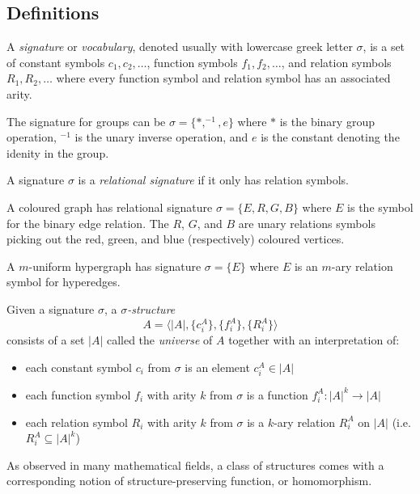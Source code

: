 \subsection{Definitions}
\begin{defn}
A \textit{signature} or \textit{vocabulary}, denoted usually with lowercase greek letter $\sigma$, is a set of constant symbols $c_{1},c_{2},\dots$, function symbols $f_{1},f_{2},\dots$, and relation symbols $R_{1},R_{2},\dots$ where every function symbol and relation symbol has an associated arity. 
\end{defn}
\begin{exmpl}
The signature for groups can be $\sigma = \{*,^{-1},e\}$ where $*$ is the binary group operation, $^{-1}$ is the unary inverse operation, and $e$ is the constant denoting the idenity in the group. 
\end{exmpl}
\begin{defn}
A signature $\sigma$ is a \textit{relational signature} if it only has relation symbols.
\end{defn}
\begin{exmpl}
A coloured graph has relational signature $\sigma = \{E,R,G,B\}$ where $E$ is the symbol for the binary edge relation. The $R$, $G$, and $B$ are unary relations symbols picking out the red, green, and blue (respectively) coloured vertices. 
\end{exmpl}
\begin{exmpl}
A $m$-uniform hypergraph has signature $\sigma = \{E\}$ where $E$ is an $m$-ary relation symbol for hyperedges.
\end{exmpl}
\begin{defn}
Given a signature $\sigma$, a \textit{$\sigma$-structure} 
$$A = \langle |A|, \{c_{i}^{A}\}, \{f_{i}^{A}\}, \{R_{i}^{A}\} \rangle$$ 
consists of a set $|A|$ called the \textit{universe} of $A$ together with an interpretation of:
\begin{itemize}
    \item each constant symbol $c_{i}$ from $\sigma$ is an element $c_{i}^{A} \in |A|$ 
    \item each function symbol $f_{i}$ with arity $k$ from $\sigma$ is a function $f_{i}^{A}:|A|^{k} \longrightarrow |A|$
    \item each relation symbol $R_{i}$ with arity $k$ from $\sigma$ is a $k$-ary relation $R_{i}^{A}$ on $|A|$ (i.e. $R_{i}^{A} \subseteq |A|^{k}$) 
\end{itemize}
\label{defn:structure}
\end{defn}
As observed in many mathematical fields, a class of structures comes with a corresponding notion of structure-preserving function, or homomorphism. 
